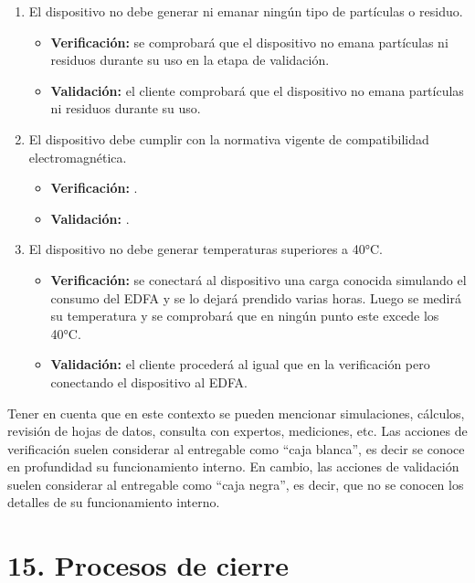 \documentclass[
11pt, %
codirector, %
]{charter}
\begin{document}
\begin{enumerate}
\begin{enumerate}
\item El dispositivo no debe generar ni emanar ningún tipo de partículas o residuo.
\begin{itemize}
	\item \textbf{Verificación:} se comprobará que el dispositivo no emana partículas ni residuos durante su uso en la etapa de validación.
	\item \textbf{Validación:} el cliente comprobará que el dispositivo no emana partículas ni residuos durante su uso.
\end{itemize}

\item El dispositivo debe cumplir con la normativa vigente de compatibilidad electromagnética.
\begin{itemize}
	\item \textbf{Verificación:} .
	\item \textbf{Validación:} .
\end{itemize}

\item El dispositivo no debe generar temperaturas superiores a 40°C.
\begin{itemize}
	\item \textbf{Verificación:} se conectará al dispositivo una carga conocida simulando el consumo del EDFA y se lo dejará prendido varias horas. Luego se medirá su temperatura y se comprobará que en ningún punto este excede los 40°C.
	\item \textbf{Validación:} el cliente procederá al igual que en la verificación pero conectando el dispositivo al EDFA.
\end{itemize}

\end{enumerate}
\end{enumerate}

Tener en cuenta que en este contexto se pueden mencionar simulaciones, cálculos, revisión de hojas de datos, consulta con expertos, mediciones, etc.  Las acciones de verificación suelen considerar al entregable como ``caja blanca'', es decir se conoce en profundidad su funcionamiento interno.  En cambio, las acciones de validación suelen considerar al entregable como ``caja negra'', es decir, que no se conocen los detalles de su funcionamiento interno.


\section{15. Procesos de cierre}    
\label{sec:cierre}
\end{document}
